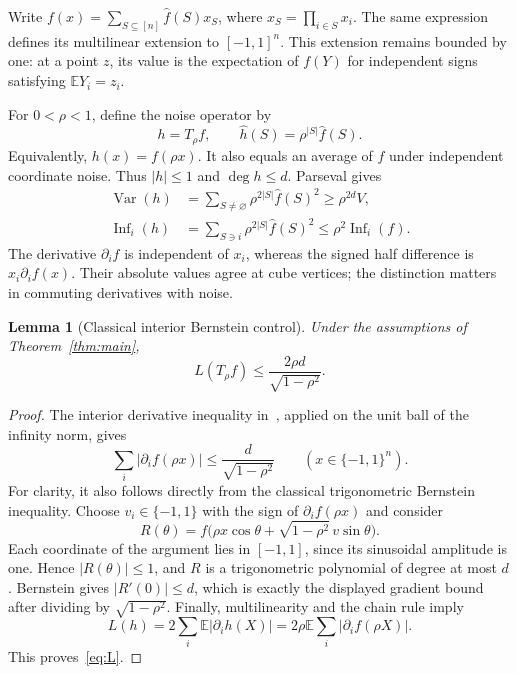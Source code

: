 \documentclass[11pt]{article}
\newtheorem{lemma}[theorem]{Lemma}
\theoremstyle{remark}\newtheorem{remark}[theorem]{Remark}
\newcommand{\E}{\mathbb E}
\newcommand{\Var}{\operatorname{Var}}
\newcommand{\Inf}{\operatorname{Inf}}
\newcommand{\Q}{\{-1,1\}^n}
\begin{document}
Write $f(x)=\sum_{S\subseteq[n]}\widehat f(S)x_S$, where $x_S=\prod_{i\in S}x_i$. The same expression defines its multilinear extension to $[-1,1]^n$. This extension remains bounded by one: at a point $z$, its value is the expectation of $f(Y)$ for independent signs satisfying $\E Y_i=z_i$.

For $0<\rho<1$, define the noise operator by
\[
 h=T_\rho f,\qquad \widehat h(S)=\rho^{|S|}\widehat f(S).
\]
Equivalently, $h(x)=f(\rho x)$. It also equals an average of $f$ under independent coordinate noise. Thus $|h|\le1$ and $\deg h\le d$. Parseval gives
\begin{align}
 \Var(h)&=\sum_{S\ne\varnothing}\rho^{2|S|}\widehat f(S)^2
             \ge\rho^{2d}V,\label{eq:var}\\
 \Inf_i(h)&=\sum_{S\ni i}\rho^{2|S|}\widehat f(S)^2
             \le\rho^2\Inf_i(f).\label{eq:inf}
\end{align}
The derivative $\partial_i f$ is independent of $x_i$, whereas the signed half difference is $x_i\partial_i f(x)$. Their absolute values agree at cube vertices; the distinction matters in commuting derivatives with noise.

\begin{lemma}[Classical interior Bernstein control]\label{lem:bern}
Under the assumptions of Theorem~\ref{thm:main},
\begin{equation}\label{eq:L}
 L(T_\rho f)\le\frac{2\rho d}{\sqrt{1-\rho^2}}.
\end{equation}
\end{lemma}
\begin{proof}
The interior derivative inequality in~\cite[Proposition 3.2]{FHKL}, applied on the unit ball of the infinity norm, gives
\[
 \sum_i|\partial_i f(\rho x)|\le\frac{d}{\sqrt{1-\rho^2}}
 \qquad(x\in\Q).
\]
For clarity, it also follows directly from the classical trigonometric Bernstein inequality. Choose $v_i\in\{-1,1\}$ with the sign of $\partial_i f(\rho x)$ and consider
\[
 R(\theta)=f\bigl(\rho x\cos\theta+\sqrt{1-\rho^2}\,v\sin\theta\bigr).
\]
Each coordinate of the argument lies in $[-1,1]$, since its sinusoidal amplitude is one. Hence $|R(\theta)|\le1$, and $R$ is a trigonometric polynomial of degree at most $d$. Bernstein gives $|R'(0)|\le d$, which is exactly the displayed gradient bound after dividing by $\sqrt{1-\rho^2}$. Finally, multilinearity and the chain rule imply
\[
 L(h)=2\sum_i\E|\partial_i h(X)|
     =2\rho\E\sum_i|\partial_i f(\rho X)|.
\]
This proves~\eqref{eq:L}.
\end{proof}
\end{document}
